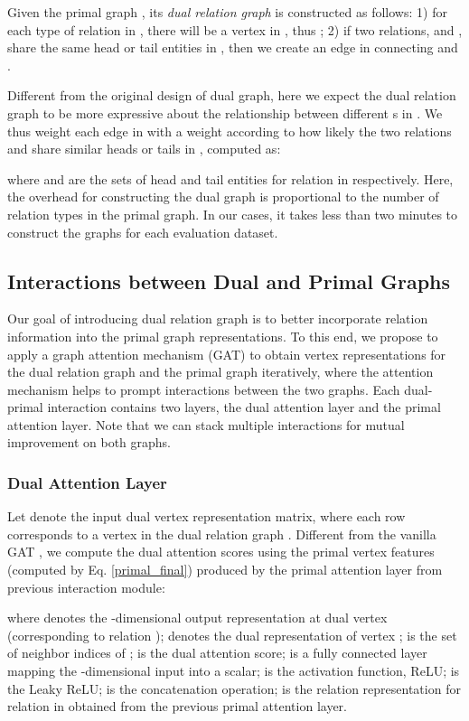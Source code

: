 \documentclass{article}
\begin{document}
Given the primal graph , its \emph{dual relation graph}  is constructed as follows: 
1) for each type of relation  in , there will be a vertex  in , thus ; 2) if two relations,  and , share the same head or tail entities in , then we create an edge  in  connecting  and . 

Different from the original design of dual graph, here we expect the dual relation graph to be more expressive about the relationship between different s in . We thus weight each edge  in  with a weight  according to how likely the two relations  and  share similar heads or tails in , computed as:


where  and  are the sets of head and tail entities for relation  in  respectively. Here, the overhead for constructing the dual graph is proportional to the number of relation types in the primal graph. In our cases, it takes less than two minutes to construct the graphs for each evaluation dataset. 

\subsection{Interactions between Dual and Primal Graphs}
Our goal of introducing dual relation graph is to better incorporate relation information into the primal graph representations. To this end, we propose to apply a graph attention mechanism (GAT) to obtain vertex representations for the dual relation graph and the primal graph iteratively, where the attention mechanism helps to prompt interactions between the two graphs. Each dual-primal interaction contains two layers, the dual attention layer and the primal attention layer. Note that we can stack multiple interactions for mutual improvement on both graphs. 

\subsubsection{Dual Attention Layer}
Let  denote the input dual vertex representation matrix, where each row corresponds to a vertex in the dual relation graph . Different from the vanilla GAT \cite{velickovic2018graph}, we compute the dual attention scores using the primal vertex features  (computed by Eq. \ref{primal_final}) produced by the primal attention layer from previous interaction module:



where  denotes the -dimensional output representation at dual vertex  (corresponding to relation );  denotes the dual representation of vertex ;  is the set of neighbor indices of ;  is the dual attention score;  
 is a fully connected layer mapping the -dimensional input into a scalar; 
 is the activation function, ReLU;  is the Leaky ReLU;  is the concatenation operation;  is the relation representation for relation  in  obtained from the previous primal attention layer.
\end{document}
